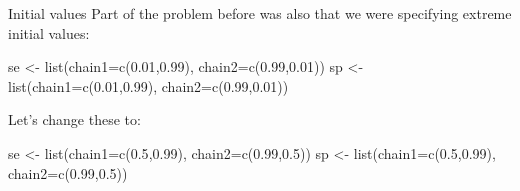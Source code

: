 \documentclass[
  ignorenonframetext,
  aspectratio=169,
]{beamer}
\newenvironment{Shaded}{\begin{snugshade}}{\end{snugshade}}
\newcommand{\AttributeTok}[1]{\textcolor[rgb]{0.77,0.63,0.00}{#1}}
\newcommand{\FloatTok}[1]{\textcolor[rgb]{0.00,0.00,0.81}{#1}}
\newcommand{\FunctionTok}[1]{\textcolor[rgb]{0.00,0.00,0.00}{#1}}
\newcommand{\NormalTok}[1]{#1}
\newcommand{\OtherTok}[1]{\textcolor[rgb]{0.56,0.35,0.01}{#1}}
\begin{document}
\begin{frame}[fragile]{Initial values}
\protect\hypertarget{initial-values}{}
Part of the problem before was also that we were specifying extreme
initial values:

\scriptsize

\begin{Shaded}
\begin{Highlighting}[]
\NormalTok{se }\OtherTok{\textless{}{-}} \FunctionTok{list}\NormalTok{(}\AttributeTok{chain1=}\FunctionTok{c}\NormalTok{(}\FloatTok{0.01}\NormalTok{,}\FloatTok{0.99}\NormalTok{), }\AttributeTok{chain2=}\FunctionTok{c}\NormalTok{(}\FloatTok{0.99}\NormalTok{,}\FloatTok{0.01}\NormalTok{))}
\NormalTok{sp }\OtherTok{\textless{}{-}} \FunctionTok{list}\NormalTok{(}\AttributeTok{chain1=}\FunctionTok{c}\NormalTok{(}\FloatTok{0.01}\NormalTok{,}\FloatTok{0.99}\NormalTok{), }\AttributeTok{chain2=}\FunctionTok{c}\NormalTok{(}\FloatTok{0.99}\NormalTok{,}\FloatTok{0.01}\NormalTok{))}
\end{Highlighting}
\end{Shaded}

\normalsize

\pause

Let's change these to:

\scriptsize

\begin{Shaded}
\begin{Highlighting}[]
\NormalTok{se }\OtherTok{\textless{}{-}} \FunctionTok{list}\NormalTok{(}\AttributeTok{chain1=}\FunctionTok{c}\NormalTok{(}\FloatTok{0.5}\NormalTok{,}\FloatTok{0.99}\NormalTok{), }\AttributeTok{chain2=}\FunctionTok{c}\NormalTok{(}\FloatTok{0.99}\NormalTok{,}\FloatTok{0.5}\NormalTok{))}
\NormalTok{sp }\OtherTok{\textless{}{-}} \FunctionTok{list}\NormalTok{(}\AttributeTok{chain1=}\FunctionTok{c}\NormalTok{(}\FloatTok{0.5}\NormalTok{,}\FloatTok{0.99}\NormalTok{), }\AttributeTok{chain2=}\FunctionTok{c}\NormalTok{(}\FloatTok{0.99}\NormalTok{,}\FloatTok{0.5}\NormalTok{))}
\end{Highlighting}
\end{Shaded}

\normalsize
\end{frame}
\end{document}
